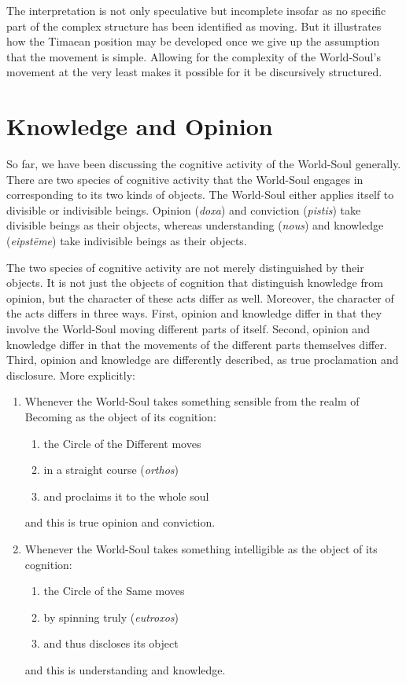 The interpretation is not only speculative but incomplete insofar as no specific part of the complex structure has been identified as moving. But it illustrates how the Timaean position may be developed once we give up the assumption that the movement is simple. Allowing for the complexity of the World-Soul's movement at the very least makes it possible for it be discursively structured.


\section{Knowledge and Opinion} %
\label{sec:knowledge_and_opinion}

So far, we have been discussing the cognitive activity of the World-Soul generally. There are two species of cognitive activity that the World-Soul engages in corresponding to its two kinds of objects. The World-Soul either applies itself to divisible or indivisible beings. Opinion (\emph{doxa}) and conviction (\emph{pistis}) take divisible beings as their objects, whereas understanding (\emph{nous}) and knowledge (\emph{eipstēme}) take indivisible beings as their objects. 

The two species of cognitive activity are not merely distinguished by their objects. It is not just the objects of cognition that distinguish knowledge from opinion, but the character of these acts differ as well. Moreover, the character of the acts differs in three ways. First, opinion and knowledge differ in that they involve the World-Soul moving different parts of itself. Second, opinion and knowledge differ in that the movements of the different parts themselves differ. Third, opinion and knowledge are differently described, as true proclamation and disclosure. More explicitly:
\begin{enumerate}[(1)]
	\item Whenever the World-Soul takes something sensible from the realm of Becoming as the object of its cognition:
	\begin{enumerate}
		\item the Circle of the Different moves
		\item in a straight course (\emph{orthos})
		\item and proclaims it to the whole soul
	\end{enumerate}
and this is true opinion and conviction.
	\item Whenever the World-Soul takes something intelligible as the object of its cognition:
	\begin{enumerate}
		\item the Circle of the Same moves
		\item by spinning truly (\emph{eutroxos})
		\item and thus discloses its object
	\end{enumerate}
and this is understanding and knowledge.
\end{enumerate}

